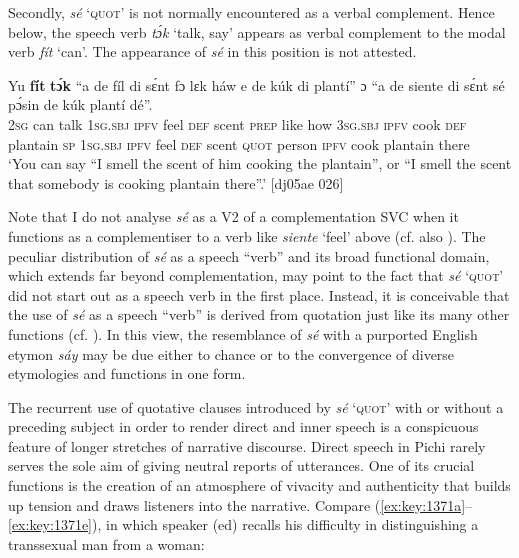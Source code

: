 Secondly, \textit{sé} ‘\textsc{quot}’ is not normally encountered as a verbal complement. Hence below, the speech verb \textit{tɔ́k} ‘talk, say’ appears as verbal complement to the modal verb \textit{fít} ‘can’. The appearance of \textit{sé} in this position is not attested. 


\ea%
    \label{ex:key:1370}
    \gll Yu  \textbf{fít}  \textbf{tɔ́k}  “a    de  fíl  di  sɛ́nt    fɔ  lɛk  háw 
e    de  kúk    di  plantí”  ɔ  “a    de  siente  di  sɛ́nt
sé   pɔ́sin  de  kúk    plantí  dé”.\\
\textsc{2sg}  can  talk  \textsc{1sg.sbj}  \textsc{ipfv}  feel  \textsc{def}  scent  \textsc{prep}  like  how
\textsc{3sg.sbj}  \textsc{ipfv}  cook  \textsc{def}  plantain  \textsc{sp}  \textsc{1sg.sbj}  \textsc{ipfv}  feel    \textsc{def}  scent
\textsc{quot}    person  \textsc{ipfv}  cook  plantain  there\\

\glt ‘You can say “I smell the scent of him cooking the plantain”, or “I smell 
the scent that somebody is cooking plantain there”.’ [dj05ae 026]
\z

Note that I do not analyse \textit{sé} as a V2 of a complementation SVC when it functions as a complementiser to a verb like \textit{siente} ‘feel’ above (cf. also ). The peculiar distribution of \textit{sé} as a speech “verb” and its broad functional domain, which extends far beyond complementation, may point to the fact that \textit{sé} ‘\textsc{quot’} did not start out as a speech verb in the first place. Instead, it is conceivable that the use of \textit{sé} as a speech “verb” is derived from quotation just like its many other functions (cf. \citealt[272–275]{Güldemann2008}). In this view, the resemblance of \textit{sé} with a purported English etymon \textit{sáy} may be due either to chance or to the convergence of diverse etymologies and functions in one form.


The recurrent use of quotative clauses introduced by \textit{sé} ‘\textsc{quot}’ with or without a preceding subject in order to render direct and inner speech is a conspicuous feature of longer stretches of narrative discourse. Direct speech in Pichi rarely serves the sole aim of giving neutral reports of utterances. One of its crucial functions is the creation of an atmosphere of vivacity and authenticity that builds up tension and draws listeners into the narrative. Compare (\ref{ex:key:1371a}–\ref{ex:key:1371e}), in which speaker (ed) recalls his difficulty in distinguishing a transsexual man from a woman: 



